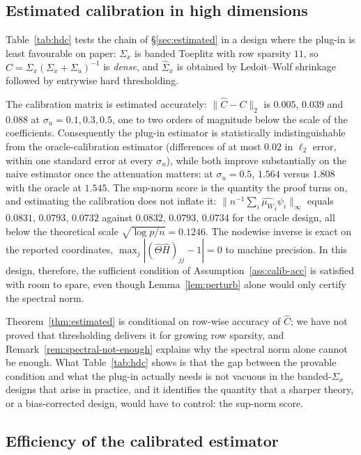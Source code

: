 \documentclass[12pt,a4paper]{article}
\theoremstyle{definition}
\theoremstyle{remark}
\newcommand{\muv}{\mu_W}
\newcommand{\Ccal}{C}
\begin{document}
\subsection{Estimated calibration in high dimensions}
\label{sec:hd-est}

Table~\ref{tab:hdc} tests the chain of \S\ref{sec:estimated} in a design where the
plug-in is least favourable on paper: $\Sigma_x$ is banded Toeplitz with row sparsity
$11$, so $\Ccal=\Sigma_x(\Sigma_x+\Sigma_u)^{-1}$ is \emph{dense}, and $\hat\Sigma_x$ is
obtained by Ledoit--Wolf shrinkage followed by entrywise hard thresholding.

The calibration matrix is estimated accurately: $\|\hat\Ccal-\Ccal\|_2$ is
$0.005$, $0.039$ and $0.088$ at $\sigma_u=0.1,0.3,0.5$, one to two orders of
magnitude below the scale of the coefficients. Consequently the plug-in
estimator is statistically indistinguishable from the oracle-calibration estimator
(differences of at most $0.02$ in $\ell_2$ error, within one standard error at every
$\sigma_u$), while both improve substantially on the naive estimator once the
attenuation matters: at $\sigma_u=0.5$, $1.564$ versus $1.808$ with the oracle at $1.545$.
The sup-norm score is the quantity the proof turns on, and estimating the
calibration does not inflate it: $\|n^{-1}\sum_i{\hat{\muv}}_i\psi_i\|_\infty$ equals
$0.0831$, $0.0793$, $0.0732$ against $0.0832$, $0.0793$, $0.0734$ for the oracle design,
all below the theoretical scale $\sqrt{\log p/n}=0.1246$. The nodewise inverse is exact on
the reported coordinates, $\max_j|(\hat\Theta\hat H)_{jj}-1|=0$ to machine precision. In this
design, therefore, the
sufficient condition of Assumption~\ref{ass:calib-acc} is satisfied with room to spare,
even though Lemma~\ref{lem:perturb} alone would only certify the spectral norm.

Theorem~\ref{thm:estimated} is conditional on
row-wise accuracy of $\hat\Ccal$; we have not proved that thresholding delivers it for
growing row sparsity, and Remark~\ref{rem:spectral-not-enough} explains why the spectral
norm alone cannot be enough. What Table~\ref{tab:hdc} shows is that the gap between the
provable condition and what the plug-in actually needs is not vacuous in the
banded-$\Sigma_x$ designs that arise in practice, and it identifies the quantity that a
sharper theory, or a bias-corrected design, would have to control: the sup-norm score.



\subsection{Efficiency of the calibrated estimator}
\label{sec:efficiency}
\end{document}
